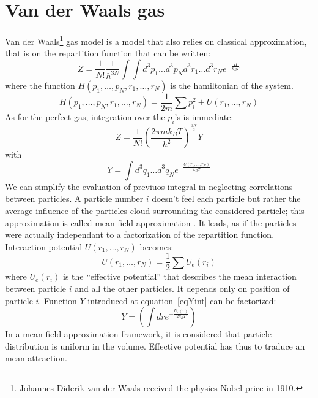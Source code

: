 \documentclass[12pt]{book}
\begin{document}
\section{Van der Waals gas}\label{secvanderwaals}
Van der Waals\footnote{Johannes Diderik van der Waals received the
physics Nobel price in 1910.} gas model is a
model that also 
relies on classical approximation, that is on the repartition function that
can be written:
\begin{equation}
Z=\frac{1}{N!} \frac{1}{h^{3N}}\int\int d^3p_1\dots d^3p_N
d^3r_1\dots d^3r_N  e^{-\frac{H}{k_BT}}
\end{equation}
where the function $H(p_1 ,\dots ,p_N,r_1 ,\dots ,r_N)$ is the hamiltonian of
the system.
\begin{equation}
H(p_1 ,\dots ,p_N,r_1 ,\dots ,r_N) = \frac{1}{2m}\sum p_i^2+U(r_1
,\dots,r_N)  
\end{equation}
As for the perfect gas, integration over the $p_i$'s is immediate:
\begin{equation}
Z=\frac{1}{N!}\left(\frac{2\pi m k_BT }{h^2}\right)^{\frac{3N}{2}}Y
\end{equation}
with
\begin{equation}\label{eqYint}
Y=\int d^3q_1\dots d^3q_N  e^{-\frac{U(r_1,\dots,r_N)}{k_BT}}
\end{equation}
We can simplify the evaluation of previuos integral in neglecting
correlations between particles. A particle number $i$ doesn't feel
each particle 
but rather the average influence of the particles cloud surrounding
the considered particle; this approximation is called mean field approximation
. It leads, as if the particles were actually
independant to a factorization of the repartition function.
Interaction potential $U(r_1,\dots,r_N)$ becomes:
\begin{equation}
U(r_1,\dots,r_N) =\frac{1}{2}\sum U_{e}(r_i)
\end{equation}
where $U_e(r_i)$ is the ``effective potential'' that describes the mean
interaction between particle $i$ and all the other particles. It depends only
on position of particle $i$.
Function $Y$ introduced at equation~\ref{eqYint} can be factorized:
\begin{equation}
Y=\left(\int dr e^{-\frac{U_{e}(r)}{2k_BT}}\right)
\end{equation}
In a mean field approximation framework, it is considered that particle
distribution is uniform in the volume. Effective potential has thus to
traduce an mean attraction.
\end{document}

